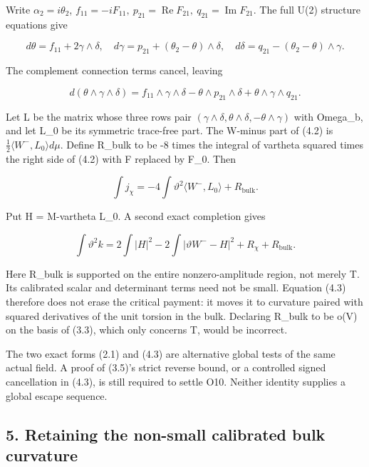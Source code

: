 \documentclass[
  10pt,
]{article}
\begin{document}
Write \(\alpha_2=i\theta_2\),
\(f_{11}=-iF_{11},\ p_{21}=\operatorname{Re}F_{21},\
q_{21}=\operatorname{Im}F_{21}\). The full U(2) structure equations give

\[
 d\theta=f_{11}+2\gamma\wedge\delta,\quad
 d\gamma=p_{21}+(\theta_2-\theta)\wedge\delta,\quad
 d\delta=q_{21}-(\theta_2-\theta)\wedge\gamma.
\]

The complement connection terms cancel, leaving

\[
 d(\theta\wedge\gamma\wedge\delta)
 =f_{11}\wedge\gamma\wedge\delta-\theta\wedge p_{21}\wedge\delta
                                   +\theta\wedge\gamma\wedge q_{21}.
                                                               \tag{4.2}
\]

Let L be the matrix whose three rows pair
\((\gamma\wedge\delta,\theta\wedge\delta,-\theta\wedge\gamma)\) with
Omega\_b, and let L\_0 be its symmetric trace-free part. The W-minus
part of (4.2) is \(\tfrac12\langle W^-,L_0\rangle d\mu\). Define R\_bulk
to be -8 times the integral of vartheta squared times the right side of
(4.2) with F replaced by F\_0. Then

\[
 \int j_\chi=-4\int\vartheta^2\langle W^-,L_0\rangle+R_{\mathrm{bulk}}.
\]

Put H = M-vartheta L\_0. A second exact completion gives

\[
 \boxed{\int\vartheta^2k
     =2\int|H|^2-2\int|\vartheta W^--H|^2
                                     +R_\chi+R_{\mathrm{bulk}}.} \tag{4.3}
\]

Here R\_bulk is supported on the entire nonzero-amplitude region, not
merely T. Its calibrated scalar and determinant terms need not be small.
Equation (4.3) therefore does not erase the critical payment: it moves
it to curvature paired with squared derivatives of the unit torsion in
the bulk. Declaring R\_bulk to be o(V) on the basis of (3.3), which only
concerns T, would be incorrect.

The two exact forms (2.1) and (4.3) are alternative global tests of the
same actual field. A proof of (3.5)'s strict reverse bound, or a
controlled signed cancellation in (4.3), is still required to settle
O10. Neither identity supplies a global escape sequence.

\hypertarget{retaining-the-non-small-calibrated-bulk-curvature}{%
\subsection{5. Retaining the non-small calibrated bulk
curvature}\label{retaining-the-non-small-calibrated-bulk-curvature}}
\end{document}
